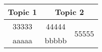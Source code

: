 \documentclass{article}
\begin{document}
\begin{table}[!h]
\centering\renewcommand{}
\begin{tabular}{c|c|c}
\hline
Topic 1 & \multicolumn{2}{c}{Topic 2}\\
\hline
33333 & 44444 & \multirow{2}{*}{55555}\\
\cline{1-2}
aaaaa & bbbbb\\
\hline
 \end{tabular}
\caption{}
  \label{table:example-app}
\end{table}
\end{document}
